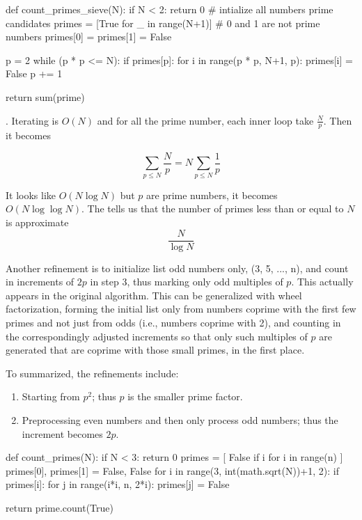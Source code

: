 \begin{python}
def count_primes_sieve(N):
    if N < 2:
        return 0
    # intialize all numbers prime candidates
    primes = [True for _ in range(N+1)]
    # 0 and 1 are not prime numbers
    primes[0] = primes[1] = False

    p = 2
    while (p * p <= N):
        if primes[p]:
            for i in range(p * p, N+1, p):
                primes[i] = False
        p += 1

    return sum(prime)
\end{python}

. Iterating  is $O(N)$ and for all the prime number, each inner loop take $\frac{N}{p}$. Then it becomes 

$$
\sum_{p \leq N} \frac{N}{p} = N \sum_{p \leq N} \frac{1}{p}
$$

It looks like $O(N \log N)$ but $p$ are prime numbers, it becomes $O(N \log \log N)$. The  tells us that the number of primes less than or equal to $N$ is approximate
$$
\frac{N}{\log N}
$$


Another refinement is to initialize list odd numbers only, (3, 5, ..., n), and count in increments of $2p$ in step 3, thus marking only odd multiples of $p$. This actually appears in the original algorithm. This can be generalized with wheel factorization, forming the initial list only from numbers coprime with the first few primes and not just from odds (i.e., numbers coprime with 2), and counting in the correspondingly adjusted increments so that only such multiples of $p$ are generated that are coprime with those small primes, in the first place.



To summarized, the refinements include:
\begin{enumerate}
\item Starting from $p^2$; thus $p$ is the smaller prime factor. 
\item Preprocessing even numbers and then only process odd numbers; thus the increment becomes $2p$.
\end{enumerate}

\begin{python}
def count_primes(N):
    if N < 3:
        return 0
    primes = [
        False if i%
        for i in range(n)
    ]
    primes[0], primes[1] = False, False
    for i in range(3, int(math.sqrt(N))+1, 2):
        if primes[i]:
            for j in range(i*i, n, 2*i):
                primes[j] = False

    return prime.count(True)
\end{python}

